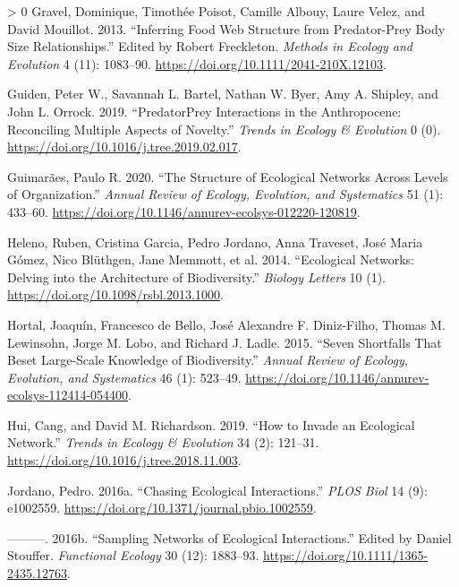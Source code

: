 \documentclass[10pt,oneside]{article}
\newlength{\cslhangindent}
\newenvironment{CSLReferences}[3] %
 {%
  \setlength{\parindent}{0pt}
  \ifodd #1 \everypar{\setlength{\hangindent}{\cslhangindent}}\ignorespaces\fi
  \ifnum #2 > 0
  \setlength{\parskip}{#2\baselineskip}
  \fi
 }%
 {}
\begin{document}
\begin{CSLReferences}{1}{0}
\leavevmode\hypertarget{ref-Gravel2013InfFoo}{}%
Gravel, Dominique, Timothée Poisot, Camille Albouy, Laure Velez, and
David Mouillot. 2013. {``Inferring Food Web Structure from Predator-Prey
Body Size Relationships.''} Edited by Robert Freckleton. \emph{Methods
in Ecology and Evolution} 4 (11): 1083--90.
\url{https://doi.org/10.1111/2041-210X.12103}.

\leavevmode\hypertarget{ref-Guiden2019PrePre}{}%
Guiden, Peter W., Savannah L. Bartel, Nathan W. Byer, Amy A. Shipley,
and John L. Orrock. 2019. {``PredatorPrey Interactions in the
Anthropocene: Reconciling Multiple Aspects of Novelty.''} \emph{Trends
in Ecology \& Evolution} 0 (0).
\url{https://doi.org/10.1016/j.tree.2019.02.017}.

\leavevmode\hypertarget{ref-Guimaraes2020StrEco}{}%
Guimarães, Paulo R. 2020. {``The Structure of Ecological Networks Across
Levels of Organization.''} \emph{Annual Review of Ecology, Evolution,
and Systematics} 51 (1): 433--60.
\url{https://doi.org/10.1146/annurev-ecolsys-012220-120819}.

\leavevmode\hypertarget{ref-Heleno2014EcoNet}{}%
Heleno, Ruben, Cristina Garcia, Pedro Jordano, Anna Traveset, José Maria
Gómez, Nico Blüthgen, Jane Memmott, et al. 2014. {``Ecological Networks:
Delving into the Architecture of Biodiversity.''} \emph{Biology Letters}
10 (1). \url{https://doi.org/10.1098/rsbl.2013.1000}.

\leavevmode\hypertarget{ref-Hortal2015SevSho}{}%
Hortal, Joaquín, Francesco de Bello, José Alexandre F. Diniz-Filho,
Thomas M. Lewinsohn, Jorge M. Lobo, and Richard J. Ladle. 2015. {``Seven
Shortfalls That Beset Large-Scale Knowledge of Biodiversity.''}
\emph{Annual Review of Ecology, Evolution, and Systematics} 46 (1):
523--49. \url{https://doi.org/10.1146/annurev-ecolsys-112414-054400}.

\leavevmode\hypertarget{ref-Hui2019HowInv}{}%
Hui, Cang, and David M. Richardson. 2019. {``How to Invade an Ecological
Network.''} \emph{Trends in Ecology \& Evolution} 34 (2): 121--31.
\url{https://doi.org/10.1016/j.tree.2018.11.003}.

\leavevmode\hypertarget{ref-Jordano2016ChaEco}{}%
Jordano, Pedro. 2016a. {``Chasing Ecological Interactions.''} \emph{PLOS
Biol} 14 (9): e1002559.
\url{https://doi.org/10.1371/journal.pbio.1002559}.

\leavevmode\hypertarget{ref-Jordano2016SamNet}{}%
---------. 2016b. {``Sampling Networks of Ecological Interactions.''}
Edited by Daniel Stouffer. \emph{Functional Ecology} 30 (12): 1883--93.
\url{https://doi.org/10.1111/1365-2435.12763}.


\end{CSLReferences}
\end{document}

